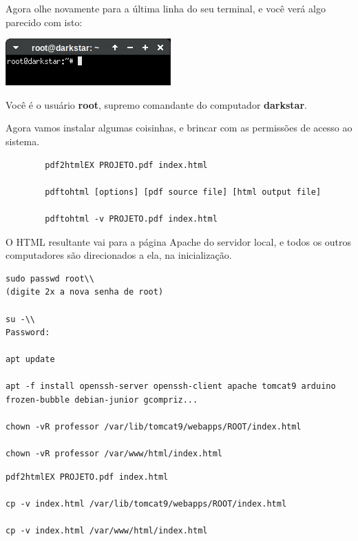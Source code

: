 \begin{multicols}{2}
	Agora olhe novamente para a última linha do seu terminal, e você verá algo parecido com isto:
	
	\begin{center}
		\includegraphics[width=.6\linewidth]{./IMG-GIT/Screenshot_20231222_155332.png}
	\end{center}	

Você é o usuário \textbf{root}, supremo comandante do computador \textbf{darkstar}.

Agora vamos instalar algumas coisinhas, e brincar com as permissões de acesso ao sistema.


	\begin{lstlisting}
		pdf2htmlEX PROJETO.pdf index.html
		
		pdftohtml [options] [pdf source file] [html output file]
		
		pdftohtml -v PROJETO.pdf index.html
	\end{lstlisting}
	
	
	O HTML resultante vai para a página Apache do servidor local, e todos os outros computadores são direcionados a ela, na inicialização.
	
	\begin{lstlisting}
sudo passwd root\\
(digite 2x a nova senha de root)
		
su -\\
Password:
		
apt update
		
apt -f install openssh-server openssh-client apache tomcat9 arduino frozen-bubble debian-junior gcompriz...
		
chown -vR professor /var/lib/tomcat9/webapps/ROOT/index.html
		
chown -vR professor /var/www/html/index.html
	\end{lstlisting}
	
	\begin{lstlisting}
pdf2htmlEX PROJETO.pdf index.html
		
cp -v index.html /var/lib/tomcat9/webapps/ROOT/index.html
		
cp -v index.html /var/www/html/index.html
	\end{lstlisting}
	
\end{multicols}



